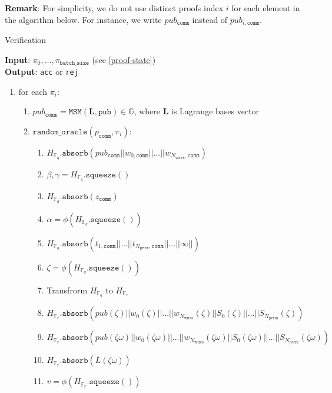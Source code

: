 \textbf{Remark}: For simplicity, we do not use distinct proofs index $i$ for each element in the algorithm below.
For instance, we write $pub_{\texttt{comm}}$ instead of $pub_{i, \texttt{comm}}$.
\begin{algorithm}[H]
    \caption{Verification}
    \textbf{Input}: $\pi_0, \dots, \pi_{\texttt{batch\_size}}$ (see \ref{proof-state}) \\
    \textbf{Output}: \texttt{acc} or \texttt{rej}
    \begin{enumerate}
        \item for each $\pi_i$:
        \begin{enumerate}
            \item $pub_{\texttt{comm}} = \texttt{MSM}(\textbf{L}, \texttt{pub}) \in \mathbb{G}$, where $\textbf{L}$ is Lagrange bases vector
            \item $\texttt{random\_oracle}(p_{\texttt{comm}}, \pi_i)$:
            \begin{enumerate}
                \item $H_{\mathbb{F}_q}.\texttt{absorb}(pub_{\texttt{comm}} || w_{0, \texttt{comm}} || ... || w_{N_{\text{wires}}, \texttt{comm}})$
                \item $\beta, \gamma = H_{\mathbb{F}_q}.\texttt{squeeze}()$
                \item $H_{\mathbb{F}_q}.\texttt{absorb}(z_{\texttt{comm}})$
                \item $\alpha = \phi(H_{\mathbb{F}_q}.\texttt{squeeze}())$
                \item $H_{\mathbb{F}_q}.\texttt{absorb}(t_{1, \texttt{comm}} ||  ... || t_{N_{\texttt{perm}}, \texttt{comm}} ||  ... || \infty ||)$
                \item $\zeta = \phi(H_{\mathbb{F}_q}.\texttt{squeeze}())$
                \item Transfrorm $H_{\mathbb{F}_q}$ to $H_{\mathbb{F}_r}$
                \item $H_{\mathbb{F}_r}.\texttt{absorb}(pub(\zeta) || w_{0}(\zeta) || ... || w_{N_{\text{wires}}}(\zeta)
                || S_0(\zeta) || ... || S_{N_{\text{perm}}}(\zeta))$
                \item $H_{\mathbb{F}_r}.\texttt{absorb}(pub(\zeta\omega) || w_{0}(\zeta\omega) || ... || w_{N_{\text{wires}}}(\zeta\omega)
                || S_0(\zeta\omega) || ... || S_{N_{\text{perm}}}(\zeta\omega))$
                \item $H_{\mathbb{F}_r}.\texttt{absorb}(\bar{L}(\zeta\omega))$
                \item $v = \phi(H_{\mathbb{F}_r}.\texttt{squeeze}())$

\end{enumerate}
\end{enumerate}
\end{enumerate}
\end{algorithm}

